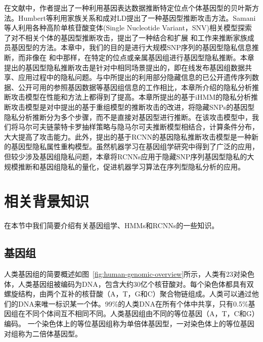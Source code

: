 在文献\cite{schadt2012bayesian}中，作者提出了一种利用基因表达数据推断特定位点个体基因型的贝叶斯方法。Humbert等\cite{humbert2013addressing}利用家族关系和成对LD提出了一种基因型推断攻击方法。Samani等人\cite{samani2015quantifying}利用各种高阶单核苷酸变体(Single Nucleotide Variant，SNV)相关模型探索了对不相关个体的基因型推断攻击，提出了一种结合和扩展\cite{humbert2013addressing} 和\cite{deznabi2018inference}工作来推断家族成员基因型的方法。本章中，我们的目的是进行大规模SNP序列的基因型隐私信息推断，而非像在\cite{humbert2013addressing} 和\cite{deznabi2018inference}中那样，在特定的位点\cite{schadt2012bayesian}或亲属基因组进行基因型隐私推断。本章提出的基因型隐私推断攻击是针对\cite{samani2015quantifying}中相同场景提出的，即在线发布基因组数据共享、应用过程中的隐私问题。与\cite{samani2015quantifying}中所提出的利用部分隐藏信息的已公开遗传序列数据、公开可用的参照基因数据等基因组信息的工作相比，本章所介绍的隐私分析推断攻击模型在性能和方法上都得到了提高。本章所提出的基于iHMM的隐私分析推断攻击模型是对\cite{samani2015quantifying}中提出的基于重组模型的推断攻击的改进，将隐藏SNPs的基因型隐私分析推断分为多个步骤，而不是直接对基因型进行推断。在该攻击模型中，我们将马尔可夫链蒙特卡罗抽样策略与隐马尔可夫推断模型相结合，计算条件分布，大大提高了攻击能力。此外，提出的基于RCNN的基因隐私推断攻击模型是一种新的基因型隐私属性重构模型。虽然机器学习在基因组学研究\cite{libbrecht2015machine}中得到了广泛的应用，但较少涉及基因组隐私问题，本章将RCNNs应用于隐藏SNP序列基因型隐私的大规模推断和基因组隐私的量化，促进机器学习算法在序列型隐私分析的应用。


\section{相关背景知识}\label{sec:back}

在本节中我们简要介绍有关基因组学、HMMs和RCNNs的一些知识。

\subsection{基因组}
人类基因组的简要概述如图~\ref{fig:human-genomic-overview}所示\cite{samani2015quantifying}，人类有23对染色体，人类基因组被编码为DNA，包含大约30亿个核苷酸对。每个染色体都具有双螺旋结构，由两个互补的核苷酸（A，T，G和C）聚合物链组成。人类可以通过他们的DNA来唯一标识某一个体。99\%的人类DNA在所有个体中共享，只有0.5\%基因组在不同个体间互不相同不同。人类基因组由不同的等位基因（A，T，C和G）编码。 一个染色体上的等位基因组称为单倍体基因型，一对染色体上的等位基因对组称为二倍体基因型\cite{durbin1998biological}。

